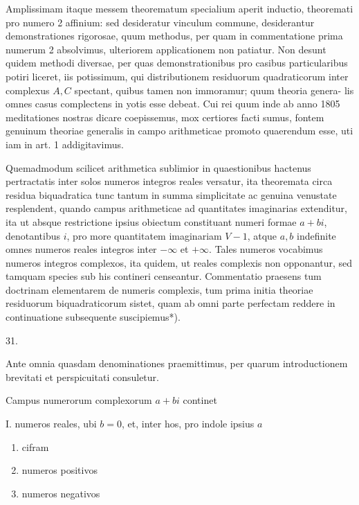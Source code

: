 \documentclass[10pt]{article}
\begin{document}
Amplissimam itaque messem theorematum specialium aperit inductio, theoremati pro numero 2 affinium: sed desideratur vinculum commune, desiderantur demonstrationes rigorosae, quum methodus, per quam in commentatione prima numerum 2 absolvimus, ulteriorem applicationem non patiatur. Non desunt quidem methodi diversae, per quas demonstrationibus pro casibus particularibus potiri liceret, iis potissimum, qui distributionem residuorum quadraticorum inter complexus \(A, C\) spectant, quibus tamen non immoramur; quum theoria genera-
lis omnes casus complectens in yotis esse debeat. Cui rei quum inde ab anno 1805 meditationes nostras dicare coepissemus, mox certiores facti sumus, fontem genuinum theoriae generalis in campo arithmeticae promoto quaerendum esse, uti iam in art. 1 addigitavimus.

Quemadmodum scilicet arithmetica sublimior in quaestionibus hactenus pertractatis inter solos numeros integros reales versatur, ita theoremata circa residua biquadratica tunc tantum in summa simplicitate ac genuina venustate resplendent, quando campus arithmeticae ad quantitates imaginarias extenditur, ita ut absque restrictione ipsius obiectum constituant numeri formae \(a+b i\), denotantibus \(i\), pro more quantitatem imaginariam \(V-1\), atque \(a, b\) indefinite omnes numeros reales integros inter \(-\infty\) et \(+\infty\). Tales numeros vocabimus numeros integros complexos, ita quidem, ut reales complexis non opponantur, sed tamquam species sub his contineri censeantur. Commentatio praesens tum doctrinam elementarem de numeris complexis, tum prima initia theoriae residuorum biquadraticorum sistet, quam ab omni parte perfectam reddere in continuatione subsequente suscipiemus*).

31.

Ante omnia quasdam denominationes praemittimus, per quarum introductionem brevitati et perspicuitati consuletur.

Campus numerorum complexorum \(a+b i\) continet

I. numeros reales, ubi \(b=0\), et, inter hos, pro indole ipsius \(a\)

\begin{enumerate}
  \item cifram

  \item numeros positivos

  \item numeros negativos

\end{enumerate}
\end{document}
